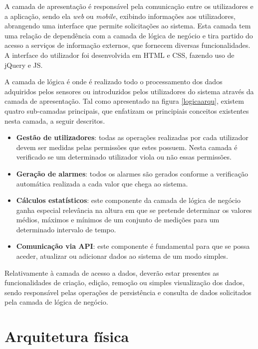A camada de apresentação é responsável pela comunicação entre os utilizadores e a aplicação, sendo ela \textit{web} ou \textit{mobile}, exibindo informações aos utilizadores, abrangendo uma interface que permite solicitações ao sistema. Esta camada tem uma relação de dependência com a camada de lógica de negócio e tira partido do acesso a serviços de informação externos, que fornecem diversas funcionalidades. A interface do utilizador foi desenvolvida em  \ac{HTML} e \acs{CSS}, fazendo uso de jQuery e \ac{JS}.





A camada de lógica é onde é realizado todo o processamento dos dados adquiridos pelos sensores ou introduzidos pelos utilizadores do sistema através da camada de apresentação.  Tal como apresentado na figura \ref{logicaarqu}, existem quatro sub-camadas principais, que enfatizam os principiais conceitos existentes nesta camada, a seguir descritos.  


\begin{itemize}
	\item \textbf{Gestão de utilizadores}: todas as operações realizadas por cada utilizador devem ser medidas pelas permissões que estes possuem. Nesta camada é verificado se um determinado utilizador viola ou não essas permissões. 
	
	\item \textbf{Geração de alarmes}: todos os alarmes são gerados conforme a verificação automática realizada a cada valor que chega ao sistema. 
	\item \textbf{Cálculos estatísticos}: este componente da camada de lógica de negócio ganha especial relevância na altura em que se pretende determinar os valores médios, máximos e mínimos de um conjunto de medições para um determinado intervalo de tempo. 
	\item \textbf{Comunicação via \ac{API}}: este componente é fundamental para que se possa aceder, atualizar ou adicionar dados ao sistema de um modo simples.
\end{itemize}



Relativamente à camada de acesso a dados, deverão estar presentes as funcionalidades de criação, edição, remoção ou simples visualização dos dados, sendo responsável pelas operações de persistência e consulta de dados solicitados pela camada de lógica de negócio.


\section{Arquitetura física}


